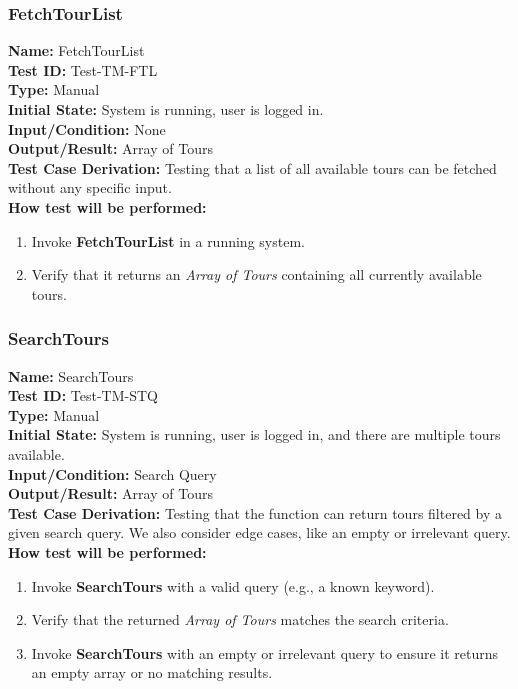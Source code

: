 \documentclass[12pt, titlepage]{article}
\begin{document}
 \subsubsection{FetchTourList}
\textbf{Name:} FetchTourList \label{itm:Test-TM-FTL} \\
\textbf{Test ID:} Test-TM-FTL \\
\textbf{Type:} Manual \\
\textbf{Initial State:} System is running, user is logged in. \\
\textbf{Input/Condition:} None \\
\textbf{Output/Result:} Array of Tours \\
\textbf{Test Case Derivation:} Testing that a list of all available tours can be fetched without any specific input. \\
\textbf{How test will be performed:}
\begin{enumerate}
    \item Invoke \textbf{FetchTourList} in a running system.
    \item Verify that it returns an \textit{Array of Tours} containing all currently available tours.
\end{enumerate}

\subsubsection{SearchTours}
\textbf{Name:} SearchTours \label{itm:Test-TM-STQ} \\
\textbf{Test ID:} Test-TM-STQ \\
\textbf{Type:} Manual \\
\textbf{Initial State:} System is running, user is logged in, and there are multiple tours available. \\
\textbf{Input/Condition:} Search Query \\
\textbf{Output/Result:} Array of Tours \\
\textbf{Test Case Derivation:} Testing that the function can return tours filtered by a given search query. We also consider edge cases, like an empty or irrelevant query. \\
\textbf{How test will be performed:}
\begin{enumerate}
    \item Invoke \textbf{SearchTours} with a valid query (e.g., a known keyword).
    \item Verify that the returned \textit{Array of Tours} matches the search criteria.
    \item Invoke \textbf{SearchTours} with an empty or irrelevant query to ensure it returns an empty array or no matching results.
\end{enumerate}
\end{document}
